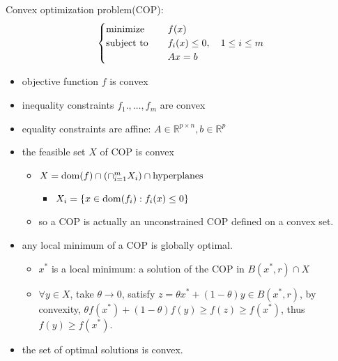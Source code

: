 \begin{remark}
    Convex optimization problem(COP):
    \[\begin{cases}
        \operatorname{minimize} \quad &f(x)\\
        \operatorname{subject\ to} \quad &f_i(x) \le 0, \quad 1 \le i \le m\\
        &Ax = b
    \end{cases}\]
    \begin{itemize}
        \item objective function $f$ is convex
        \item inequality constraints $f_1., \dots, f_m$ are convex
        \item equality constraints are affine: $A \in \mathbb{R}^{p \times n}, b \in \mathbb{R}^p$
        \item the feasible set $X$ of COP is convex \begin{itemize}
            \item $X = \operatorname{dom}(f) \cap (\cap_{i = 1}^m X_i) \cap \text{hyperplanes}$ \begin{itemize}
                \item $X_i = \left\{x \in \operatorname{dom}(f_i): f_i(x) \le 0\right\}$
            \end{itemize}
            \item so a COP is actually an unconstrained COP defined on a convex set. 
        \end{itemize}
        \item any local minimum of a COP is globally optimal.\begin{itemize}
            \item $x^*$ is a local minimum: a solution of the COP in $B(x^*, r) \cap X$
            \item $\forall y \in X$, take $\theta \to 0$, satisfy $z = \theta x^* + (1 - \theta)y \in B(x^*, r)$, by convexity, $\theta f(x^*) + (1 - \theta)f(y) \ge f(z) \ge f(x^*)$, thus $f(y) \ge f(x^*)$.
        \end{itemize}
        \item the set of optimal solutions is convex.
    \end{itemize}
\end{remark}


